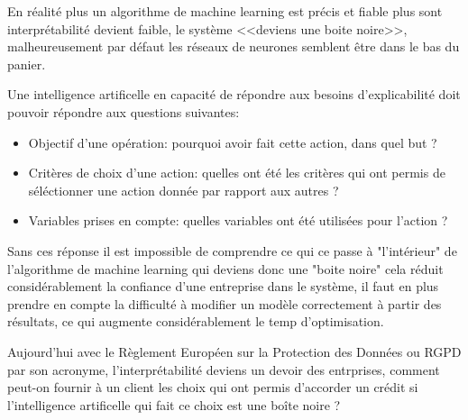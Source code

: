             En réalité plus un algorithme de machine learning est précis et fiable 
            plus sont interprétabilité devient faible, le système <<deviens une boite 
            noire>>, malheureusement par défaut les réseaux de neurones semblent 
            être dans le bas du panier. \newline 
            
            Une intelligence artificelle en capacité de répondre aux besoins d'explicabilité 
            doit pouvoir répondre aux questions suivantes: \newline 

            \begin{itemize}
                \item Objectif d'une opération: pourquoi avoir fait cette action, 
                dans quel but ? \newline 
                \item Critères de choix d'une action: quelles ont été les critères 
                qui ont permis de séléctionner une action donnée par rapport aux 
                autres ? \newline
                \item Variables prises en compte: quelles variables ont été utilisées
                pour l'action ? \newline 
            \end{itemize}

            Sans ces réponse il est impossible de comprendre ce qui ce passe à "l'intérieur"
            de l'algorithme de machine learning qui deviens donc une "boite noire"
            cela réduit considérablement la confiance d'une entreprise dans le système,
            il faut en plus prendre en compte la difficulté à modifier un modèle correctement à 
            partir des résultats, ce qui augmente considérablement le temp d'optimisation.
            \newline

            Aujourd'hui avec le Règlement Européen sur la Protection des Données ou RGPD par son 
            acronyme, l'interprétabilité deviens un devoir des entrprises, comment 
            peut-on fournir à un client les choix qui ont permis d'accorder un crédit
            si l'intelligence artificelle qui fait ce choix est une boîte noire ?
            
